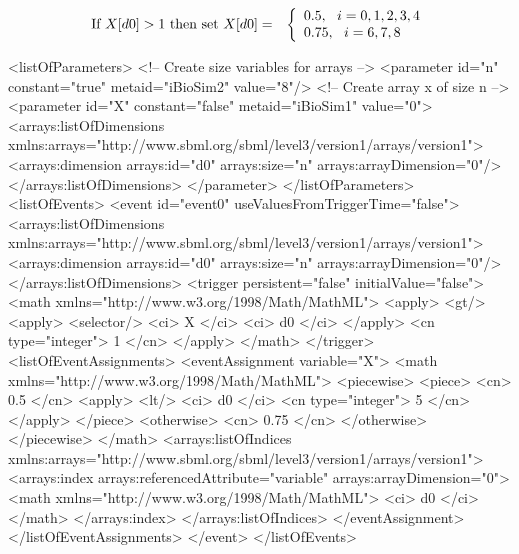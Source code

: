 \begin{eqnarray*}
\textup{If }X[d0] > 1\textup{ then set }X[d0] & = & \left\{ \begin{array}{l}
0.5,~~i = 0, 1, 2, 3, 4 \\
0.75,~~i = 6, 7, 8
\end{array}
\right.
\end{eqnarray*}

\begin{example}
<listOfParameters>
    <!-- Create size variables for arrays -->
    <parameter id="n" constant="true" metaid="iBioSim2" value="8"/>
    <!-- Create array x of size n -->
    <parameter id="X" constant="false" metaid="iBioSim1" value="0">
        <arrays:listOfDimensions
            xmlns:arrays="http://www.sbml.org/sbml/level3/version1/arrays/version1">
            <arrays:dimension arrays:id="d0" arrays:size="n" arrays:arrayDimension="0"/>
        </arrays:listOfDimensions>
    </parameter>
</listOfParameters>
<listOfEvents>
    <event id="event0" useValuesFromTriggerTime="false">
        <arrays:listOfDimensions
            xmlns:arrays="http://www.sbml.org/sbml/level3/version1/arrays/version1">
            <arrays:dimension arrays:id="d0" arrays:size="n" arrays:arrayDimension="0"/>
        </arrays:listOfDimensions>
        <trigger persistent="false" initialValue="false">
            <math xmlns="http://www.w3.org/1998/Math/MathML">
                <apply>
                    <gt/>
                    <apply>
                        <selector/>
                        <ci> X </ci>
                        <ci> d0 </ci>
                    </apply>
                    <cn type="integer"> 1 </cn>
                </apply>
            </math>
        </trigger>
        <listOfEventAssignments>
            <eventAssignment variable="X">
                <math xmlns="http://www.w3.org/1998/Math/MathML">
                    <piecewise>
                        <piece>
                            <cn> 0.5 </cn>
                            <apply>
                                <lt/>
                                <ci> d0 </ci>
                                <cn type="integer"> 5 </cn>
                            </apply>
                        </piece>
                        <otherwise>
                            <cn> 0.75 </cn>
                        </otherwise>
                    </piecewise>
                </math>
                <arrays:listOfIndices
                    xmlns:arrays="http://www.sbml.org/sbml/level3/version1/arrays/version1">
                    <arrays:index arrays:referencedAttribute="variable" arrays:arrayDimension="0">
                        <math
                            xmlns="http://www.w3.org/1998/Math/MathML">
                            <ci> d0 </ci>
                        </math>
                    </arrays:index>
                </arrays:listOfIndices>
            </eventAssignment>
        </listOfEventAssignments>
    </event>
</listOfEvents>
\end{example}

